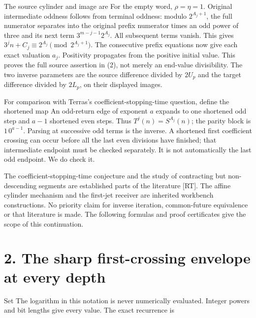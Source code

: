 The source cylinder and image are
 For the empty word,
\(\rho=\eta=1\). Original intermediate oddness follows from terminal
oddness: modulo \(2^{A_j+1}\), the full numerator separates into the
original prefix numerator times an odd power of three and its next term
\(3^{m-j-1}2^{A_j}\). All subsequent terms vanish. This gives
\(3^j n+C_j\equiv2^{A_j}\pmod{2^{A_j+1}}\). The consecutive prefix
equations now give each exact valuation \(a_j\). Positivity propagates
from the positive initial value. This proves the full source assertion
in (2), not merely an end-value divisibility. The two inverse parameters
are the source difference divided by \(2U_p\) and the target difference
divided by \(2L_p\), on their displayed images.

For comparison with Terras's coefficient-stopping-time question, define
the shortened map
An odd-return edge of exponent \(a\) expands to one shortened odd step
and \(a-1\) shortened even steps. Thus \(T^j(n)=S^{A_j}(n)\); the parity
block is \(1\,0^{a-1}\). Parsing at successive odd terms is the inverse.
A shortened first coefficient crossing can occur before all the last
even divisions have finished; that intermediate endpoint must be checked
separately. It is not automatically the last odd endpoint. We do check
it.

The coefficient-stopping-time conjecture and the study of contracting
but non-descending segments are established parts of the literature
{[}RT{]}. The affine cylinder mechanism and the first-jet receiver are
inherited workbench constructions. No priority claim for inverse
iteration, common-future equivalence or that literature is made. The
following formulas and proof certificates give the scope of this
continuation.

\section{2. The sharp first-crossing envelope at every depth}

Set
 The logarithm in
this notation is never numerically evaluated. Integer powers and bit
lengths give every value. The exact recurrence is

